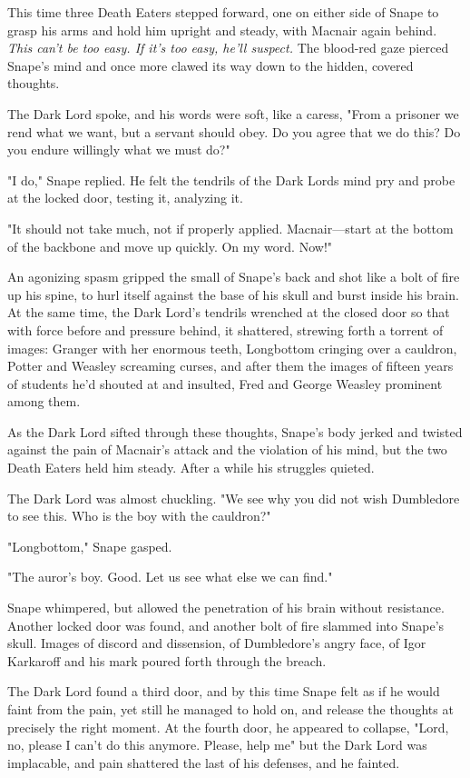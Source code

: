 This time three Death Eaters stepped forward, one on either side of Snape to grasp his arms and hold him upright and steady, with Macnair again behind. \emph{This can't be too easy. If it's too easy, he'll suspect.} The blood-red gaze pierced Snape's mind and once more clawed its way down to the hidden, covered thoughts.

The Dark Lord spoke, and his words were soft, like a caress, "From a prisoner we rend what we want, but a servant should obey. Do you agree that we do this? Do you endure willingly what we must do?"

"I do," Snape replied. He felt the tendrils of the Dark Lords mind pry and probe at the locked door, testing it, analyzing it.

"It should not take much, not if properly applied. Macnair—start at the bottom of the backbone and move up quickly. On my word. Now!"

An agonizing spasm gripped the small of Snape's back and shot like a bolt of fire up his spine, to hurl itself against the base of his skull and burst inside his brain. At the same time, the Dark Lord's tendrils wrenched at the closed door so that with force before and pressure behind, it shattered, strewing forth a torrent of images: Granger with her enormous teeth, Longbottom cringing over a cauldron, Potter and Weasley screaming curses, and after them the images of fifteen years of students he'd shouted at and insulted, Fred and George Weasley prominent among them.

As the Dark Lord sifted through these thoughts, Snape's body jerked and twisted against the pain of Macnair's attack and the violation of his mind, but the two Death Eaters held him steady. After a while his struggles quieted.

The Dark Lord was almost chuckling. "We see why you did not wish Dumbledore to see this. Who is the boy with the cauldron?"

"Longbottom," Snape gasped.

"The auror's boy. Good. Let us see what else we can find."

Snape whimpered, but allowed the penetration of his brain without resistance. Another locked door was found, and another bolt of fire slammed into Snape's skull. Images of discord and dissension, of Dumbledore's angry face, of Igor Karkaroff and his mark poured forth through the breach.

The Dark Lord found a third door, and by this time Snape felt as if he would faint from the pain, yet still he managed to hold on, and release the thoughts at precisely the right moment. At the fourth door, he appeared to collapse, "Lord, no, please{\el} I can't do this anymore. Please, help me{\el}" but the Dark Lord was implacable, and pain shattered the last of his defenses, and he fainted.

